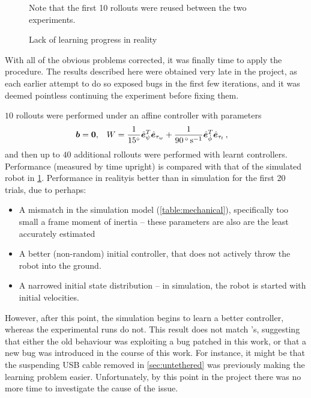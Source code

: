 \documentclass[main.tex]{subfiles}
\begin{document}
	\begin{figure}[b!]
		\centering
		\begin{minipage}{0.5\linewidth - 2em}
			
		\end{minipage}\hfill
		\begin{minipage}{0.5\linewidth - 2em}
			
		\end{minipage}
		\caption{Lack of learning progress in reality}
		\label{fig:learning-compare}
		\medskip
		\small
		Note that the first 10 rollouts were reused between the two experiments.
	\end{figure}

	With all of the obvious problems corrected, it was finally time to apply the {\Pilco} procedure.
	The results described here were obtained very late in the project, as each earlier attempt to do so exposed bugs in the first few iterations, and it was deemed pointless continuing the experiment before fixing them.

	$10$ rollouts were performed under an affine controller with parameters
	\begin{align}
		\bm{b} &= \bm{0}, &
		W &=
			\frac{1}{\SI{15}{\degree}}
			\hat{\bm{e}}_{\psi}^T\hat{\bm{e}}_{\tau_w}
			+ \frac{1}{\SI{90}{\degree\per\second}}
			\hat{\bm{e}}_{\dot\phi}^T\hat{\bm{e}}_{\tau_t}\,,
	\end{align}
	and then up to $40$ additional rollouts were performed with learnt controllers.
	Performance (measured by time upright) is compared with that of the simulated robot in \cref{fig:learning-compare}.
	Performance in reality\footnotemark is better than in simulation for the first 20 trials, due to perhaps:
	\begin{itemize}[noitemsep]
		\item A mismatch in the simulation model (\cref{table:mechanical}), specifically too small a frame moment of inertia -- these parameters are also are the least accurately estimated
		\item A better (non-random) initial controller, that does not actively throw the robot into the ground.
		\item A narrowed initial state distribution -- in simulation, the robot is started with initial velocities.
	\end{itemize}
	However, after this point, the simulation begins to learn a better controller, whereas the experimental runs do not.
	This result does not match \cite{aleksi}'s, suggesting that either the old behaviour was exploiting a bug patched in this work, or that a new bug was introduced in the course of this work.
	For instance, it might be that the suspending USB cable removed in \cref{sec:untethered} was previously making the learning problem easier.
	Unfortunately, by this point in the project there was no more time to investigate the cause of the issue.
\end{document}
